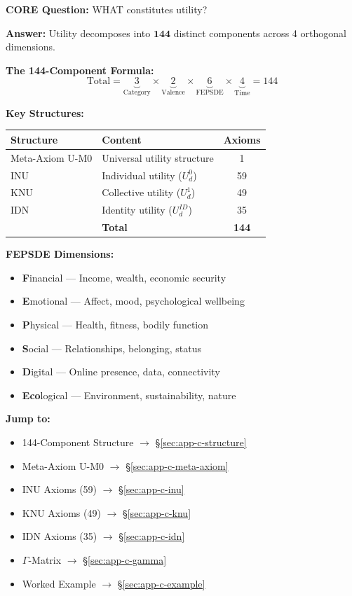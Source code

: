 \begin{tcolorbox}[colback=yellow!10!white, colframe=yellow!75!black, 
    title=\textbf{Quick Reference}]

\textbf{CORE Question:} WHAT constitutes utility?

\textbf{Answer:} Utility decomposes into $\mathbf{144}$ distinct components 
across 4 orthogonal dimensions.

\textbf{The 144-Component Formula:}
\[
\text{Total} = \underbrace{3}_{\text{Category}} \times \underbrace{2}_{\text{Valence}} \times \underbrace{6}_{\text{FEPSDE}} \times \underbrace{4}_{\text{Time}} = 144
\]

\textbf{Key Structures:}
\begin{center}
\small
\begin{tabular}{@{}llc@{}}
\toprule
\textbf{Structure} & \textbf{Content} & \textbf{Axioms} \\
\midrule
Meta-Axiom U-M0 & Universal utility structure & 1 \\
INU & Individual utility ($U^0_d$) & 59 \\
KNU & Collective utility ($U^1_d$) & 49 \\
IDN & Identity utility ($U^{ID}_d$) & 35 \\
\midrule
& \textbf{Total} & \textbf{144} \\
\bottomrule
\end{tabular}
\end{center}

\textbf{FEPSDE Dimensions:}
\begin{itemize}[nosep]
    \item \textbf{F}inancial --- Income, wealth, economic security
    \item \textbf{E}motional --- Affect, mood, psychological wellbeing
    \item \textbf{P}hysical --- Health, fitness, bodily function
    \item \textbf{S}ocial --- Relationships, belonging, status
    \item \textbf{D}igital --- Online presence, data, connectivity
    \item \textbf{Eco}logical --- Environment, sustainability, nature
\end{itemize}

\textbf{Jump to:}
\begin{itemize}[nosep]
    \item 144-Component Structure $\rightarrow$ \S\ref{sec:app-c-structure}
    \item Meta-Axiom U-M0 $\rightarrow$ \S\ref{sec:app-c-meta-axiom}
    \item INU Axioms (59) $\rightarrow$ \S\ref{sec:app-c-inu}
    \item KNU Axioms (49) $\rightarrow$ \S\ref{sec:app-c-knu}
    \item IDN Axioms (35) $\rightarrow$ \S\ref{sec:app-c-idn}
    \item $\Gamma$-Matrix $\rightarrow$ \S\ref{sec:app-c-gamma}
    \item Worked Example $\rightarrow$ \S\ref{sec:app-c-example}
\end{itemize}

\end{tcolorbox}

